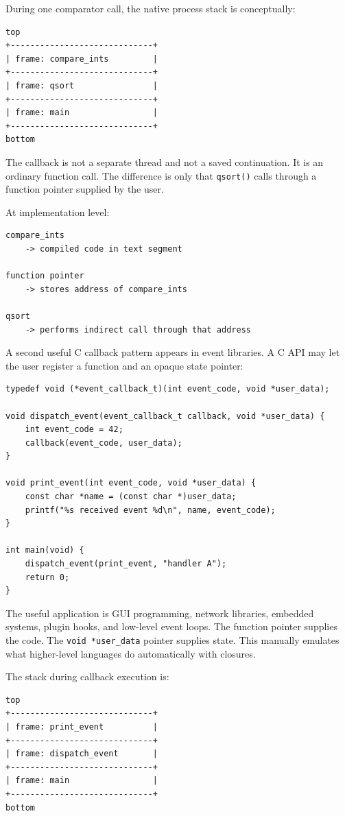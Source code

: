During one comparator call, the native process stack is conceptually:

\begin{verbatim}
top
+-----------------------------+
| frame: compare_ints         |
+-----------------------------+
| frame: qsort                |
+-----------------------------+
| frame: main                 |
+-----------------------------+
bottom
\end{verbatim}

The callback is not a separate thread and not a saved continuation. It is an ordinary function call. The difference is only that \texttt{qsort()} calls through a function pointer supplied by the user.

At implementation level:

\begin{verbatim}
compare_ints
    -> compiled code in text segment

function pointer
    -> stores address of compare_ints

qsort
    -> performs indirect call through that address
\end{verbatim}

A second useful C callback pattern appears in event libraries. A C API may let the user register a function and an opaque state pointer:

\begin{verbatim}
typedef void (*event_callback_t)(int event_code, void *user_data);

void dispatch_event(event_callback_t callback, void *user_data) {
    int event_code = 42;
    callback(event_code, user_data);
}

void print_event(int event_code, void *user_data) {
    const char *name = (const char *)user_data;
    printf("%s received event %d\n", name, event_code);
}

int main(void) {
    dispatch_event(print_event, "handler A");
    return 0;
}
\end{verbatim}

The useful application is GUI programming, network libraries, embedded systems, plugin hooks, and low-level event loops. The function pointer supplies the code. The \texttt{void *user\_data} pointer supplies state. This manually emulates what higher-level languages do automatically with closures.

The stack during callback execution is:

\begin{verbatim}
top
+-----------------------------+
| frame: print_event          |
+-----------------------------+
| frame: dispatch_event       |
+-----------------------------+
| frame: main                 |
+-----------------------------+
bottom
\end{verbatim}


